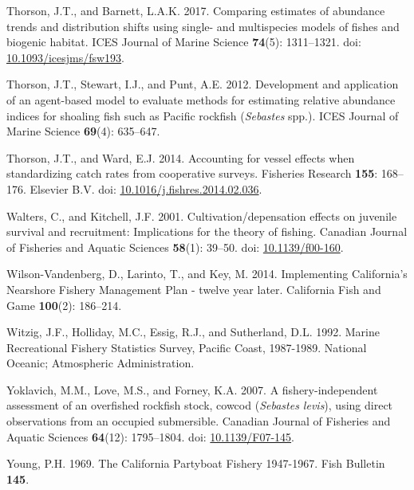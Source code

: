\documentclass[11pt,
  english,
  a4paper,
]{article}
\newlength{\cslhangindent}
\newenvironment{CSLReferences}[2] %
 {%
  \setlength{\parindent}{0pt}
  \ifodd #1 \everypar{\setlength{\hangindent}{\cslhangindent}}\ignorespaces\fi
  \ifnum #2 > 0
  \setlength{\parskip}{#2\baselineskip}
  \fi
 }%
 {}
\begin{document}
\begin{CSLReferences}{1}{0}
\leavevmode{}%
Thorson, J.T., and Barnett, L.A.K. 2017. {Comparing estimates of abundance trends and distribution shifts using single- and multispecies models of fishes and biogenic habitat}. ICES Journal of Marine Science \textbf{74}(5): 1311--1321. doi: \href{https://doi.org/10.1093/icesjms/fsw193}{10.1093/icesjms/fsw193}.

\leavevmode{}%
Thorson, J.T., Stewart, I.J., and Punt, A.E. 2012. {Development and application of an agent-based model to evaluate methods for estimating relative abundance indices for shoaling fish such as Pacific rockfish (\emph{Sebastes} spp.)}. ICES Journal of Marine Science \textbf{69}(4): 635--647.

\leavevmode{}%
Thorson, J.T., and Ward, E.J. 2014. {Accounting for vessel effects when standardizing catch rates from cooperative surveys}. Fisheries Research \textbf{155}: 168--176. Elsevier B.V. doi: \href{https://doi.org/10.1016/j.fishres.2014.02.036}{10.1016/j.fishres.2014.02.036}.

\leavevmode{}%
Walters, C., and Kitchell, J.F. 2001. {Cultivation/depensation effects on juvenile survival and recruitment: Implications for the theory of fishing}. Canadian Journal of Fisheries and Aquatic Sciences \textbf{58}(1): 39--50. doi: \href{https://doi.org/10.1139/f00-160}{10.1139/f00-160}.

\leavevmode{}%
Wilson-Vandenberg, D., Larinto, T., and Key, M. 2014. {Implementing California's Nearshore Fishery Management Plan - twelve year later}. California Fish and Game \textbf{100}(2): 186--214.

\leavevmode{}%
Witzig, J.F., Holliday, M.C., Essig, R.J., and Sutherland, D.L. 1992. {Marine Recreational Fishery Statistics Survey, Pacific Coast, 1987-1989}. National Oceanic; Atmospheric Administration.

\leavevmode{}%
Yoklavich, M.M., Love, M.S., and Forney, K.A. 2007. {A fishery-independent assessment of an overfished rockfish stock, cowcod (\emph{Sebastes levis}), using direct observations from an occupied submersible}. Canadian Journal of Fisheries and Aquatic Sciences \textbf{64}(12): 1795--1804. doi: \href{https://doi.org/10.1139/F07-145}{10.1139/F07-145}.

\leavevmode{}%
Young, P.H. 1969. {The California Partyboat Fishery 1947-1967}. Fish Bulletin \textbf{145}.

\end{CSLReferences}
\end{document}
